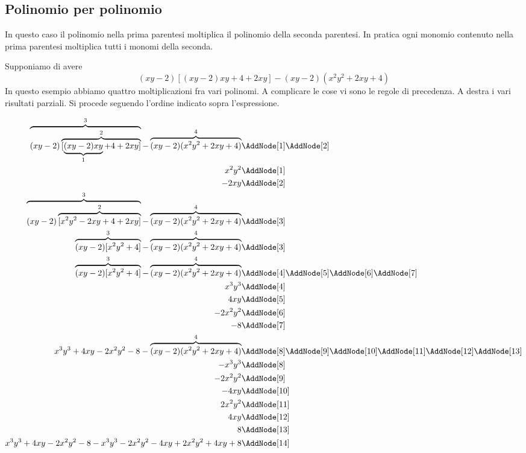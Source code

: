 \subsection{Polinomio per polinomio}
In questo caso il polinomio nella prima parentesi moltiplica il polinomio della seconda parentesi. In pratica ogni monomio contenuto nella prima parentesi moltiplica tutti i monomi della seconda.
\begin{center}

\end{center}
\begin{esempio}
Supponiamo di avere \[(xy-2)[(xy-2)xy+4+2xy]-(xy-2)(x^2y^2+2xy+4)\]
In questo esempio abbiamo quattro moltiplicazioni  fra vari polinomi. A complicare le cose vi sono le regole di precedenza. A destra i vari risultati parziali. Si procede seguendo l'ordine indicato sopra l'espressione. 
	\begin{NodesList}
		\begin{align*}
			\overbrace{(xy-2)\overbrace{[\underbrace{(xy-2)xy}_{1}+4+2xy]}^{2}}^{3}-\overbrace{(xy-2)(x^2y^2+2xy+4)}^{4} &\AddNode[1]\AddNode[2]\\
			x^2y^2&\AddNode[1]\\ 
			-2xy&\AddNode[2] \\
			\overbrace{(xy-2)\overbrace{[x^2y^2-2xy+4+2xy]}^{2}}^{3}-\overbrace{(xy-2)(x^2y^2+2xy+4)}^{4} &\AddNode[3]\\
			\overbrace{(xy-2)[x^2y^2+4]}^{3}-\overbrace{(xy-2)(x^2y^2+2xy+4)}^{4} &\AddNode[3]\\
			\overbrace{(xy-2)[x^2y^2+4]}^{3}-\overbrace{(xy-2)(x^2y^2+2xy+4)}^{4} &\AddNode[4]\AddNode[5]\AddNode[6]\AddNode[7]\\
			x^3y^3&\AddNode[4]\\    
			4xy&\AddNode[5]\\
			-2x^2y^2&\AddNode[6]\\
			-8&\AddNode[7]\\
			x^3y^3+4xy-2x^2y^2-8-\overbrace{(xy-2)(x^2y^2+2xy+4)}^{4} &\AddNode[8]\AddNode[9]\AddNode[10]\AddNode[11]\AddNode[12]\AddNode[13]\\
			-x^3y^3&\AddNode[8]\\
			-2x^2y^2&\AddNode[9]\\
			-4xy&\AddNode[10]\\   
			2x^2y^2&\AddNode[11] \\ 
			4xy&\AddNode[12]\\     
			8&\AddNode[13]\\   
			x^3y^3+4xy-2x^2y^2-8-x^3y^3-2x^2y^2-4xy+2x^2y^2+4xy+8 &\AddNode[14]\\

\end{align*}
\end{NodesList}
\end{esempio}
